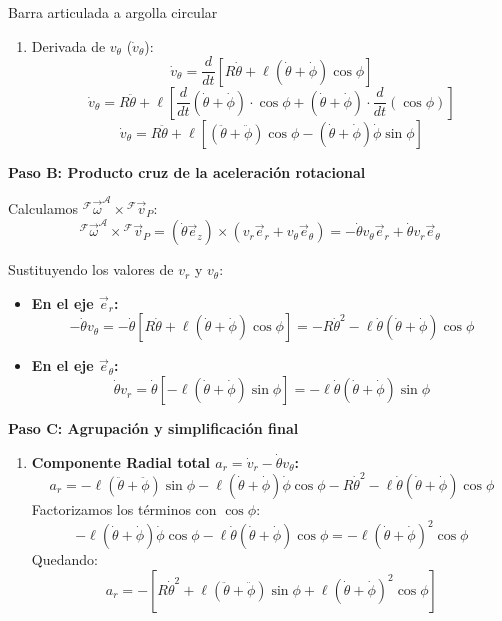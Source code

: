 \begin{solucion}{Barra articulada a argolla circular}
\begin{enumerate}
    \item Derivada de $v_\theta$ ($\dot{v}_\theta$):
    \[
    \dot{v}_\theta = \frac{d}{dt} \left[ R\dot{\theta} + \ell(\dot{\theta} + \dot{\phi})\cos\phi \right]
    \]
    \[
    \dot{v}_\theta = R\ddot{\theta} + \ell \left[ \frac{d}{dt}(\dot{\theta} + \dot{\phi}) \cdot \cos\phi + (\dot{\theta} + \dot{\phi}) \cdot \frac{d}{dt}(\cos\phi) \right]
    \]
    \[
    \dot{v}_\theta = R\ddot{\theta} + \ell \left[ (\ddot{\theta} + \ddot{\phi})\cos\phi - (\dot{\theta} + \dot{\phi})\dot{\phi}\sin\phi \right]
    \]
\end{enumerate}

\vspace{0.3cm}

\noindent\textbf{Paso B: Producto cruz de la aceleración rotacional}

Calculamos ${}^{\mathcal{F}}\vec{\omega}^{\mathcal{A}} \times {}^{\mathcal{F}}\vec{v}_P$:
\[
{}^{\mathcal{F}}\vec{\omega}^{\mathcal{A}} \times {}^{\mathcal{F}}\vec{v}_P = (\dot{\theta}\vec{e}_z) \times (v_r\vec{e}_r + v_\theta\vec{e}_\theta) = -\dot{\theta}v_\theta\vec{e}_r + \dot{\theta}v_r\vec{e}_\theta
\]

Sustituyendo los valores de $v_r$ y $v_\theta$:
\begin{itemize}
    \item \textbf{En el eje $\vec{e}_r$:}
    \[
    -\dot{\theta}v_\theta = -\dot{\theta}\left[ R\dot{\theta} + \ell(\dot{\theta} + \dot{\phi})\cos\phi \right] = -R\dot{\theta}^2 - \ell\dot{\theta}(\dot{\theta} + \dot{\phi})\cos\phi
    \]
    \item \textbf{En el eje $\vec{e}_\theta$:}
    \[
    \dot{\theta}v_r = \dot{\theta}\left[ -\ell(\dot{\theta} + \dot{\phi})\sin\phi \right] = -\ell\dot{\theta}(\dot{\theta} + \dot{\phi})\sin\phi
    \]
\end{itemize}

\vspace{0.3cm}

\noindent\textbf{Paso C: Agrupación y simplificación final}

\begin{enumerate}
    \item \textbf{Componente Radial total $a_r = \dot{v}_r - \dot{\theta}v_\theta$:}
    \[
    a_r = -\ell(\ddot{\theta} + \ddot{\phi})\sin\phi - \ell(\dot{\theta} + \dot{\phi})\dot{\phi}\cos\phi - R\dot{\theta}^2 - \ell\dot{\theta}(\dot{\theta} + \dot{\phi})\cos\phi
    \]
    Factorizamos los términos con $\cos\phi$:
    \[
    -\ell(\dot{\theta} + \dot{\phi})\dot{\phi}\cos\phi - \ell\dot{\theta}(\dot{\theta} + \dot{\phi})\cos\phi = -\ell(\dot{\theta} + \dot{\phi})^2\cos\phi
    \]
    Quedando:
    \[
    a_r = -\left[ R\dot{\theta}^2 + \ell(\ddot{\theta} + \ddot{\phi})\sin\phi + \ell(\dot{\theta} + \dot{\phi})^2\cos\phi \right]
    \]


\end{enumerate}
\end{solucion}
